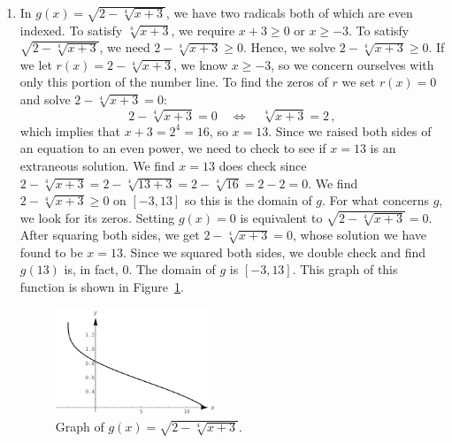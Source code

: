 \begin{example}
\begin{enumerate}
  
\ifcourse 	
\ifanalysis
\item In $g(x) = \sqrt{2-\sqrt[4]{x+3}}$, we have two radicals both of which are even indexed.  To satisfy $\sqrt[4]{x+3}$, we require $x+3 \geq 0$ or $x \geq -3$.  To satisfy $ \sqrt{2-\sqrt[4]{x+3}}$, we need $2-\sqrt[4]{x+3} \geq 0$.  Hence, we solve $2-\sqrt[4]{x+3} \geq 0$.  If we let $r(x) = 2-\sqrt[4]{x+3}$, we know $x \geq -3$, so we  concern ourselves with only this portion of the number line.  To find the zeros of $r$ we set $r(x) =0$ and solve  $2-\sqrt[4]{x+3}=0$:
$$
2-\sqrt[4]{x+3}=0\quad\Leftrightarrow \quad\sqrt[4]{x+3}=2\,,
$$
which implies that $x+3=2^4=16$, so $x=13$.
  Since we raised both sides of an equation to an even power, we need to check to see if $x=13$ is an extraneous solution.  We find $x=13$ does check since $2-\sqrt[4]{x+3} = 2 - \sqrt[4]{13+3} = 2 - \sqrt[4]{16} = 2 - 2 = 0$. We find $2-\sqrt[4]{x+3} \geq 0$ on $[-3,13]$ so this is the domain of $g$. 
For what concerns $g$, we look for its zeros.  Setting $g(x) = 0$ is equivalent to $\sqrt{2-\sqrt[4]{x+3}}=0$.  After squaring both sides, we get $2-\sqrt[4]{x+3} = 0$, whose solution we have found to be $x=13$.   Since we squared both sides, we double check and find $g(13)$ is, in fact, $0$. The domain of $g$ is $[-3,13]$. This graph of this function is shown in Figure~\ref{fig_algebraic_16}.
\begin{figure}[H]
    \begin{center}
			\includegraphics[width=0.45\textwidth]{fig_algebraic_16}
	\end{center}
    \caption{Graph of $g(x) = \sqrt{2-\sqrt[4]{x+3}}$.}
    \label{fig_algebraic_16}
\end{figure}
\fi
\fi


\end{enumerate}
\end{example}
